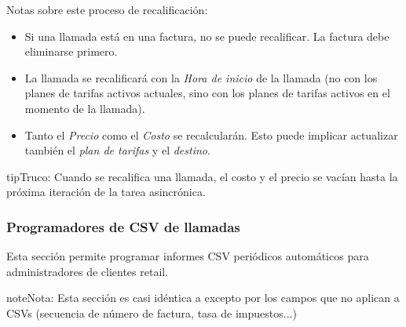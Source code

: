 \documentclass[letterpaper,10pt,spanish]{sphinxmanual}
\begin{document}
Notas sobre este proceso de recalificación:
\begin{itemize}
\item {} 
Si una llamada está en una factura, no se puede recalificar. La factura debe eliminarse primero.

\item {} 
La llamada se recalificará con la \emph{Hora de inicio} de la llamada (no con los planes de tarifas activos actuales, sino con los planes de tarifas activos en el momento de la llamada).

\item {} 
Tanto el \emph{Precio} como el \emph{Costo} se recalcularán. Esto puede implicar actualizar también el \emph{plan de tarifas} y el \emph{destino}.

\end{itemize}

\begin{notice}{tip}{Truco:}
Cuando se recalifica una llamada, el costo y el precio se vacían hasta la próxima iteración de la tarea asincrónica.
\end{notice}


\subsubsection{Programadores de CSV de llamadas}
\label{administration_portal/client/retail/calls/call_csv_schedulers:call-csv-schedulers}\label{administration_portal/client/retail/calls/call_csv_schedulers::doc}
Esta sección permite programar informes CSV periódicos automáticos para administradores de clientes retail.

\begin{notice}{note}{Nota:}
Esta sección es casi idéntica a {\hyperref[administration_portal/brand/invoicing/invoice_schedulers:invoice\string-schedulers]{}} excepto por los campos que no aplican a CSVs (secuencia de número de factura, tasa de impuestos...)
\end{notice}
\end{document}
